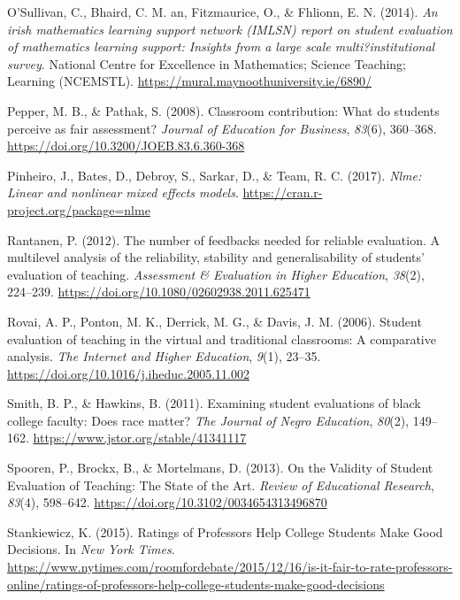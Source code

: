 \documentclass[
  man]{apa7}
\newlength{\cslhangindent}
\newlength{\cslentryspacingunit} %
\newenvironment{CSLReferences}[2] %
 {%
  \setlength{\parindent}{0pt}
  \ifodd #1
  \let\oldpar\par
  \def\par{\hangindent=\cslhangindent\oldpar}
  \fi
  \setlength{\parskip}{#2\cslentryspacingunit}
 }%
 {}
\begin{document}
\begin{CSLReferences}{1}{0}
\leavevmode{}%
O'Sullivan, C., Bhaird, C. M. an, Fitzmaurice, O., \& Fhlionn, E. N. (2014). \emph{An irish mathematics learning support network (IMLSN) report on student evaluation of mathematics learning support: Insights from a large scale multi?institutional survey}. National Centre for Excellence in Mathematics; Science Teaching; Learning (NCEMSTL). \url{https://mural.maynoothuniversity.ie/6890/}

\leavevmode{}%
Pepper, M. B., \& Pathak, S. (2008). Classroom contribution: What do students perceive as fair assessment? \emph{Journal of Education for Business}, \emph{83}(6), 360--368. \url{https://doi.org/10.3200/JOEB.83.6.360-368}

\leavevmode{}%
Pinheiro, J., Bates, D., Debroy, S., Sarkar, D., \& Team, R. C. (2017). \emph{Nlme: Linear and nonlinear mixed effects models}. \url{https://cran.r-project.org/package=nlme}

\leavevmode{}%
Rantanen, P. (2012). The number of feedbacks needed for reliable evaluation. A multilevel analysis of the reliability, stability and generalisability of students{'} evaluation of teaching. \emph{Assessment \& Evaluation in Higher Education}, \emph{38}(2), 224--239. \url{https://doi.org/10.1080/02602938.2011.625471}

\leavevmode{}%
Rovai, A. P., Ponton, M. K., Derrick, M. G., \& Davis, J. M. (2006). Student evaluation of teaching in the virtual and traditional classrooms: A comparative analysis. \emph{The Internet and Higher Education}, \emph{9}(1), 23--35. \url{https://doi.org/10.1016/j.iheduc.2005.11.002}

\leavevmode{}%
Smith, B. P., \& Hawkins, B. (2011). Examining student evaluations of black college faculty: Does race matter? \emph{The Journal of Negro Education}, \emph{80}(2), 149--162. \url{https://www.jstor.org/stable/41341117}

\leavevmode{}%
Spooren, P., Brockx, B., \& Mortelmans, D. (2013). On the Validity of Student Evaluation of Teaching: The State of the Art. \emph{Review of Educational Research}, \emph{83}(4), 598--642. \url{https://doi.org/10.3102/0034654313496870}

\leavevmode{}%
Stankiewicz, K. (2015). Ratings of {Professors} {Help} {College} {Students} {Make} {Good} {Decisions}. In \emph{New York Times}. \url{https://www.nytimes.com/roomfordebate/2015/12/16/is-it-fair-to-rate-professors-online/ratings-of-professors-help-college-students-make-good-decisions}


\end{CSLReferences}
\end{document}
